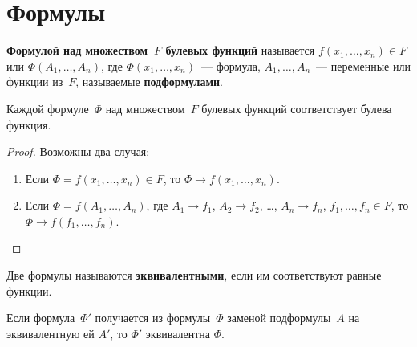 \section{Формулы}
 \textbf{Формулой над множеством~$F$ булевых функций} называется $f(x_1, \ldots, x_n) \in F$ или $\Phi(A_1, \ldots, A_n)$, где $\Phi(x_1, \ldots, x_n)$~--- формула, $A_1, \ldots, A_n$~--- переменные или функции из~$F$, называемые \textbf{подформулами}.

\begin{statement}
Каждой формуле~$\Phi$ над множеством~$F$ булевых функций соответствует булева функция.
\end{statement}
\begin{proof}
Возможны два случая:
\begin{enumerate}
	\item Если $\Phi = f(x_1, \ldots, x_n) \in F$, то $\Phi \to f(x_1, \ldots, x_n)$.
	\item Если $\Phi = f(A_1, \ldots, A_n)$, где $A_1 \to f_1$, $A_2 \to f_2$, \ldots, $A_n \to f_n$, $f_1, \ldots, f_n \in F$, то $\Phi \to f(f_1, \ldots, f_n)$.
\end{enumerate}
\end{proof}

Две формулы называются \textbf{эквивалентными}, если им соответствуют равные функции.

\begin{statement}
Если формула~$\Phi'$ получается из формулы~$\Phi$ заменой подформулы~$A$ на эквивалентную ей $A'$, то $\Phi'$ эквивалентна $\Phi$.
\end{statement}